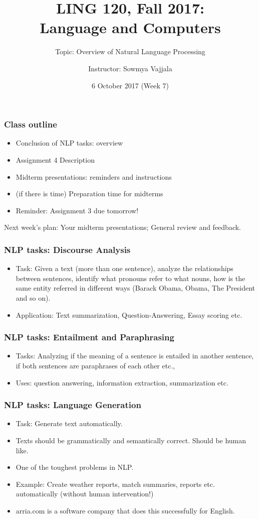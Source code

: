 \documentclass{beamer}
\author[Sowmya Vajjala]{Instructor: Sowmya Vajjala}
\title[LING 120]{LING 120, Fall 2017: \\ Language and Computers}
\subtitle{Topic: Overview of Natural Language Processing}
\date{6 October 2017 (Week 7)}
\institute{Iowa State University, USA}
\begin{document}
\begin{frame}\titlepage
\end{frame}

\begin{frame}%
\frametitle{Class outline}
\begin{itemize}
\item Conclusion of NLP tasks: overview
\item Assignment 4 Description %
\item Midterm presentations: reminders and instructions%
\item (if there is time) Preparation time for midterms%
\item Reminder: Assignment 3 due tomorrow! 
\end{itemize}
Next week's plan: Your midterm presentations; General review and feedback. 
\end{frame}

\begin{frame}
\frametitle{NLP tasks: Discourse Analysis}
\begin{itemize}
\item Task: Given a text (more than one sentence), analyze the relationships between sentences, identify what pronouns refer to what nouns, how is the same entity referred in different ways (Barack Obama, Obama, The President and so on).
\item Application: Text summarization, Question-Answering, Essay scoring etc.
\end{itemize}
\end{frame}

\begin{frame}
\frametitle{NLP tasks: Entailment and Paraphrasing}
\begin{itemize}
\item Tasks: Analyzing if the meaning of a sentence is entailed in another sentence, if both sentences are paraphrases of each other etc.,
\item Uses: question answering, information extraction, summarization etc.
\end{itemize}
\end{frame}

\begin{frame}
\frametitle{NLP tasks: Language Generation}
\begin{itemize}
\item Task: Generate text automatically.
\item Texts should be grammatically and semantically correct. Should be human like.
\item One of the toughest problems in NLP. 
\item Example: Create weather reports, match summaries, reports etc. automatically (without human intervention!)
\item arria.com is a software company that does this successfully for English.
\end{itemize}
\end{frame}
\end{document}
